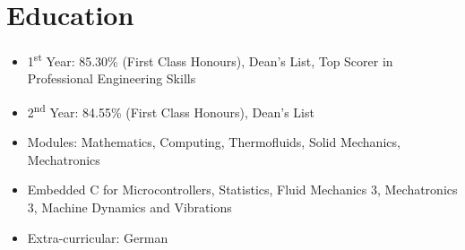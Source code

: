 \documentclass{cv}
\begin{document}
\section{Education}
\begin{subsections}
    \subtitle{MEng Mechanical Engineering \hfill London, United Kingdom}
    \begin{itemize}
        \item 1\textsuperscript{st} Year: 85.30\% (First Class Honours), Dean's List, Top Scorer in Professional Engineering Skills
        \item 2\textsuperscript{nd} Year: 84.55\% (First Class Honours), Dean's List
        \item Modules: Mathematics, Computing, Thermofluids, Solid Mechanics, Mechatronics
        \item Embedded C for Microcontrollers, Statistics, Fluid Mechanics 3, Mechatronics 3, Machine Dynamics and Vibrations
        \item Extra-curricular: German
    \end{itemize}
\end{subsections}
\end{document}
